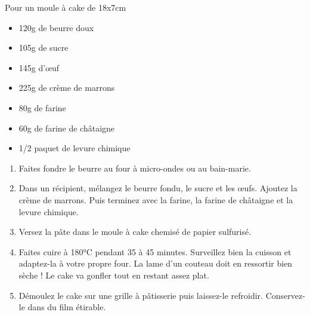 \bigskip
{}
{Pour un moule à cake de 18x7cm}{\begin{itemize}
	\item 120g de beurre doux
	\item 105g de sucre
	\item 145g d'œuf
	\item 225g de crème de marrons
	\item 80g de farine
	\item 60g de farine de châtaigne
	\item 1/2 paquet de levure chimique 
\end{itemize}}
{\phantom{.}

\medskip
\begin{enumerate}
	\item Faites fondre le beurre au four à micro-ondes ou au bain-marie. 
	\item Dans un récipient, mélangez le beurre fondu, le sucre et les \oe ufs.  Ajoutez la crème de marrons.  Puis terminez avec la farine, la farine de châtaigne et la levure chimique.
	\item Versez la pâte dans le moule à cake chemisé de papier sulfurisé.
	\item Faites cuire à 180°C pendant 35 à 45 minutes. Surveillez bien la cuisson et adaptez-la à votre propre four. La lame d'un couteau doit en ressortir bien sèche ! Le cake va gonfler tout en restant assez plat.
	\item  Démoulez le cake sur une grille à pâtisserie puis laissez-le refroidir. Conservez-le dans du film étirable. 
\end{enumerate}

\medskip
\phantom{.}}

